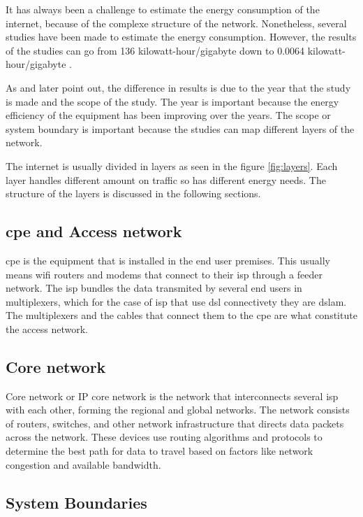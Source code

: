 It has always been a challenge to estimate the energy consumption of the internet, because of the complexe structure of the network. Nonetheless, several studies have been made to estimate the energy consumption. However, the results of the studies can go from 136 \ac{kilowatt-hour}/\ac{gigabyte}
\citet{Koomey2003} down to 0.0064 \ac{kilowatt-hour}/\ac{gigabyte} \citet{Baliga2011}.

As \citet{Coroama2015} and later \citet{Aslan2018} point out, the difference in results is due to the year that the study is made and the scope of the study. 
The year is important because the energy efficiency of the equipment has been improving over the years. 
The scope or system boundary is important because the studies can map different layers of the network.

The internet is usually divided in layers as seen in the figure \ref{fig:layers}. 
Each layer handles different amount on traffic so has different energy needs.
The structure of the layers is discussed in the following sections.

\subsection{\acl{cpe} and Access network}

\ac{cpe} is the equipment that is installed in the end user premises. This usually means wifi routers and modems that connect to their \ac{isp} through a feeder network. The \ac{isp} bundles the data transmited by several end users in multiplexers, which for the case of \ac{isp} that use \ac{dsl} connectivety they are \ac{dslam}. The multiplexers and the cables that connect them to the \ac{cpe} are what constitute the access network.

\subsection{Core network}

Core network or IP core network is the network that interconnects several \ac{isp} with each other, forming the regional and global networks.
The network consists of routers, switches, and other network infrastructure that directs data packets across the network. These devices use routing algorithms and protocols to determine the best path for data to travel based on factors like network congestion and available bandwidth.

\subsection{System Boundaries}

